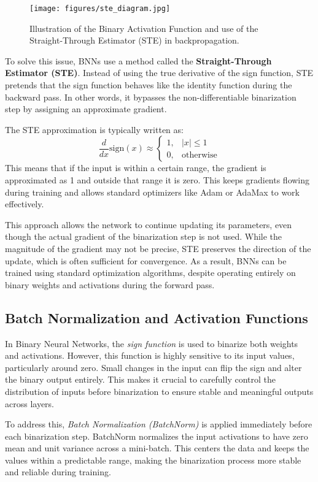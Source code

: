 \documentclass[a4paper,12pt]{report}
\begin{document}
\begin{figure}[htbp]
    \centering
    \texttt{[image: figures/ste\_diagram.jpg]}
    \caption{Illustration of the Binary Activation Function and use of the Straight-Through Estimator (STE) in backpropagation.}
    \label{fig:ste_diagram}
\end{figure}

To solve this issue, BNNs use a method called the \textbf{Straight-Through Estimator (STE)}. Instead of using the true derivative of the sign function, STE pretends that the sign function behaves like the identity function during the backward pass. In other words, it bypasses the non-differentiable binarization step by assigning an approximate gradient.

The STE approximation is typically written as:
\[\frac{d}{dx} \text{sign}(x) \approx 
\begin{cases}
1, & |x| \leq 1 \\
0, & \text{otherwise}
\end{cases}\]
This means that if the input is within a certain range, the gradient is approximated as 1 and outside that range it is zero. This keeps gradients flowing during training and allows standard optimizers like Adam or AdaMax to work effectively.

This approach allows the network to continue updating its parameters, even though the actual gradient of the binarization step is not used. While the magnitude of the gradient may not be precise, STE preserves the direction of the update, which is often sufficient for convergence. As a result, BNNs can be trained using standard optimization algorithms, despite operating entirely on binary weights and activations during the forward pass.


\clearpage
\subsection{Batch Normalization and Activation Functions}
In Binary Neural Networks, the \textit{sign function} is used to binarize both weights and activations. However, this function is highly sensitive to its input values, particularly around zero. Small changes in the input can flip the sign and alter the binary output entirely. This makes it crucial to carefully control the distribution of inputs before binarization to ensure stable and meaningful outputs across layers.

To address this, \textit{Batch Normalization (BatchNorm)} is applied immediately before each binarization step. BatchNorm normalizes the input activations to have zero mean and unit variance across a mini-batch. This centers the data and keeps the values within a predictable range, making the binarization process more stable and reliable during training.
\end{document}
